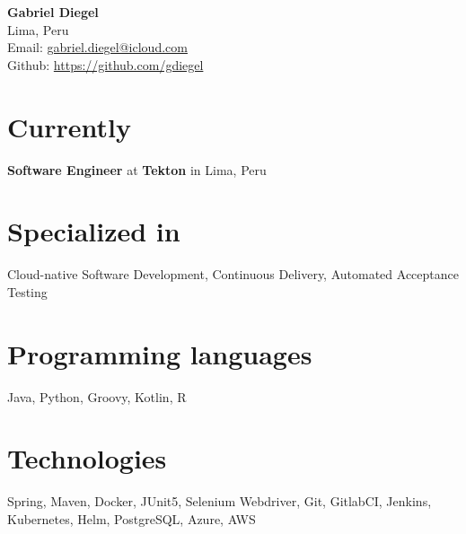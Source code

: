 \documentclass[9pt, a4paper]{extarticle}
\begin{document}
{\bf \LARGE Gabriel Diegel}\\[0.1cm]
Lima, Peru\\[0.1cm]
Email: \href{mailto:gabriel.diegel@icloud.com}{gabriel.diegel@icloud.com}\\[0.1cm]
Github: \href{https://github.com/gdiegel}{https://github.com/gdiegel}\\

\section*{Currently}
{\bf Software Engineer} at {\bf Tekton} in Lima, Peru

\section*{Specialized in}
Cloud-native Software Development, Continuous Delivery, Automated Acceptance Testing

\section*{Programming languages}
Java, Python, Groovy, Kotlin, R

\section*{Technologies}
Spring, Maven, Docker, JUnit5, Selenium Webdriver, Git, GitlabCI, Jenkins, Kubernetes, Helm, PostgreSQL, Azure, AWS
\end{document}
